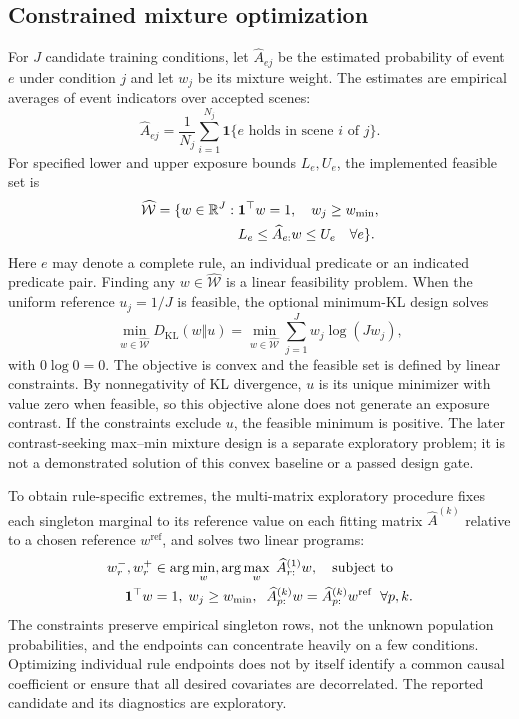 \documentclass{article}
\begin{document}
\subsection{Constrained mixture optimization}
For $J$ candidate training conditions, let $\widehat A_{ej}$ be the estimated probability of event $e$ under condition $j$ and let $w_j$ be its mixture weight. The estimates are empirical averages of event indicators over accepted scenes:
\begin{equation}
 \widehat A_{ej}=\frac{1}{N_j}\sum_{i=1}^{N_j}
 \mathbf 1\{e\text{ holds in scene }i\text{ of }j\}.
\end{equation}
For specified lower and upper exposure bounds $L_e,U_e$, the implemented feasible set is
\begin{align}
 \widehat{\mathcal W}=\{w\in\mathbb R^J:\;&\mathbf 1^\top w=1,\quad w_j\geq w_{\min},\notag\\
 &L_e\leq\widehat A_{e:}w\leq U_e\quad\forall e\}.
 \label{eq:feasible}
\end{align}
Here $e$ may denote a complete rule, an individual predicate or an indicated predicate pair. Finding any $w\in\widehat{\mathcal W}$ is a linear feasibility problem. When the uniform reference $u_j=1/J$ is feasible, the optional minimum-KL design solves
\begin{equation}
 \min_{w\in\widehat{\mathcal W}}D_{\mathrm{KL}}(w\Vert u)
 =\min_{w\in\widehat{\mathcal W}}\sum_{j=1}^{J}w_j\log(Jw_j),
\end{equation}
with $0\log 0=0$. The objective is convex and the feasible set is defined by linear constraints. By nonnegativity of KL divergence, $u$ is its unique minimizer with value zero when feasible, so this objective alone does not generate an exposure contrast. If the constraints exclude $u$, the feasible minimum is positive. The later contrast-seeking max--min mixture design is a separate exploratory problem; it is not a demonstrated solution of this convex baseline or a passed design gate.

To obtain rule-specific extremes, the multi-matrix exploratory procedure fixes each singleton marginal to its reference value on each fitting matrix $\widehat A^{(k)}$ relative to a chosen reference $w^{\mathrm{ref}}$, and solves two linear programs:
\begin{align}
 w_r^{-},w_r^{+}&\in\arg\min_{w},\arg\max_{w}
 \;\widehat A^{(1)}_{r:}w,\quad\text{subject to} \notag\\
 \mathbf1^\top w&=1,\; w_j\geq w_{\min},\;\;\widehat A^{(k)}_{p:}w=\widehat A^{(k)}_{p:}w^{\mathrm{ref}}
 \;\;\forall p,k.\label{eq:lp}
\end{align}
The constraints preserve empirical singleton rows, not the unknown population probabilities, and the endpoints can concentrate heavily on a few conditions. Optimizing individual rule endpoints does not by itself identify a common causal coefficient or ensure that all desired covariates are decorrelated. The reported candidate and its diagnostics are exploratory.
\end{document}
